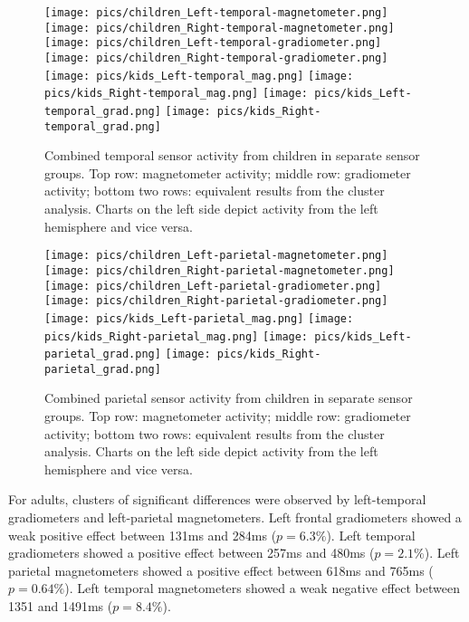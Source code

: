 \begin{figure}[!h]
\begin{center}
\texttt{[image: pics/children\_Left-temporal-magnetometer.png]}
\texttt{[image: pics/children\_Right-temporal-magnetometer.png]}
\texttt{[image: pics/children\_Left-temporal-gradiometer.png]}
\texttt{[image: pics/children\_Right-temporal-gradiometer.png]}
\texttt{[image: pics/kids\_Left-temporal\_mag.png]}
\texttt{[image: pics/kids\_Right-temporal\_mag.png]}
\texttt{[image: pics/kids\_Left-temporal\_grad.png]}
\texttt{[image: pics/kids\_Right-temporal\_grad.png]}
\caption{\label{4.2.activity.kids.temporal} Combined temporal sensor activity from children in separate sensor groups. Top row: magnetometer activity; middle row: gradiometer activity; bottom two rows: equivalent results from the cluster analysis. Charts on the left side depict activity from the left hemisphere and vice versa.}
\end{center}
\end{figure}


\begin{figure}[!h]
\begin{center}
\texttt{[image: pics/children\_Left-parietal-magnetometer.png]}
\texttt{[image: pics/children\_Right-parietal-magnetometer.png]}
\texttt{[image: pics/children\_Left-parietal-gradiometer.png]}
\texttt{[image: pics/children\_Right-parietal-gradiometer.png]}
\texttt{[image: pics/kids\_Left-parietal\_mag.png]}
\texttt{[image: pics/kids\_Right-parietal\_mag.png]}
\texttt{[image: pics/kids\_Left-parietal\_grad.png]}
\texttt{[image: pics/kids\_Right-parietal\_grad.png]}
\caption{\label{4.2.activity.kids.parietal} Combined parietal sensor activity from children in separate sensor groups. Top row: magnetometer activity; middle row: gradiometer activity; bottom two rows: equivalent results from the cluster analysis. Charts on the left side depict activity from the left hemisphere and vice versa.}
\end{center}
\end{figure}

\clearpage
For adults, clusters of significant differences were observed by left-temporal gradiometers and left-parietal magnetometers.
Left frontal gradiometers showed a weak positive effect between 131ms and 284ms ($p = 6.3\%$).
Left temporal gradiometers showed a positive effect between 257ms and 480ms ($p = 2.1\%$).
Left parietal magnetometers showed a positive effect between 618ms and 765ms ($p = 0.64\%$).
Left temporal magnetometers showed a weak negative effect between 1351 and 1491ms ($p = 8.4\%$).


